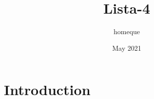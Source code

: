 \documentclass{article}
\title{Lista-4}
\author{homeque }
\date{May 2021}
\begin{document}
\maketitle

\section{Introduction}
\end{document}
